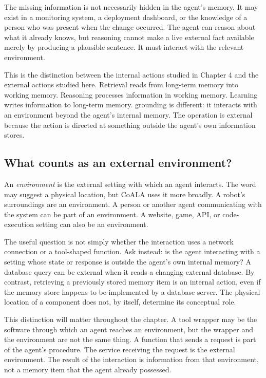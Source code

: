 The missing information is not necessarily hidden in the agent's memory. It may exist in a monitoring system, a deployment dashboard, or the knowledge of a person who was present when the change occurred. The agent can reason about what it already knows, but reasoning cannot make a live external fact available merely by producing a plausible sentence. It must interact with the relevant environment.

This is the distinction between the internal actions studied in Chapter 4 and the external actions studied here. Retrieval reads from long-term memory into working memory. Reasoning processes information in working memory. Learning writes information to long-term memory. \gls{grounding} is different: it interacts with an \gls{environment} beyond the agent's internal memory. The operation is external because the action is directed at something outside the agent's own information stores.

\subsection{What counts as an external environment?}

An \emph{environment} is the external setting with which an agent interacts. The word may suggest a physical location, but CoALA uses it more broadly. A robot's surroundings are an environment. A person or another agent communicating with the system can be part of an environment. A website, game, API, or code-execution setting can also be an environment.

The useful question is not simply whether the interaction uses a network connection or a tool-shaped function. Ask instead: is the agent interacting with a setting whose state or response is outside the agent's own internal memory? A database query can be external when it reads a changing external database. By contrast, retrieving a previously stored memory item is an internal action, even if the memory store happens to be implemented by a database server. The physical location of a component does not, by itself, determine its conceptual role.

This distinction will matter throughout the chapter. A tool wrapper may be the software through which an agent reaches an environment, but the wrapper and the environment are not the same thing. A function that sends a request is part of the agent's procedure. The service receiving the request is the external environment. The result of the interaction is information from that environment, not a memory item that the agent already possessed.

